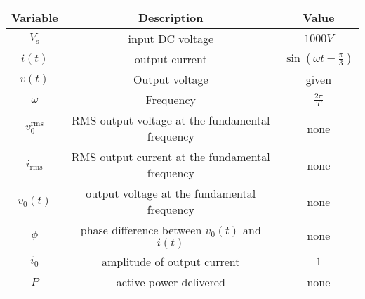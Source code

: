 \begin{tabular}{|c|c|c|} 
    \hline
    \textbf{Variable} & \textbf{Description} & \textbf{Value} \\
    \hline
    $V_\text{s}$ & input DC voltage & $1000V$ \\
    \hline
    $i(t)$ & output current & $\sin(\omega t-\frac{\pi}{3})$ \\
    \hline
    $v(t)$ & Output voltage & given \\
    \hline 
    $\omega$& Frequency &  $\frac{2\pi}{T}$     \\
    \hline
       $v_{0}^{\text{rms}}$&  RMS output voltage at the fundamental frequency& none\\
    \hline
    $i_{\text{rms}}$&  RMS output current at the fundamental frequency& none\\
    \hline
     $v_{0}(t)$&  output voltage at the fundamental frequency& none\\
    \hline
    $\phi$ & phase difference between $v_{0}(t)$ and $i(t)$&none\\
    \hline
    $i_{0}$& amplitude of output current & $1$\\
    \hline
    $P$&        active power delivered&none\\
    \hline
\end{tabular}
